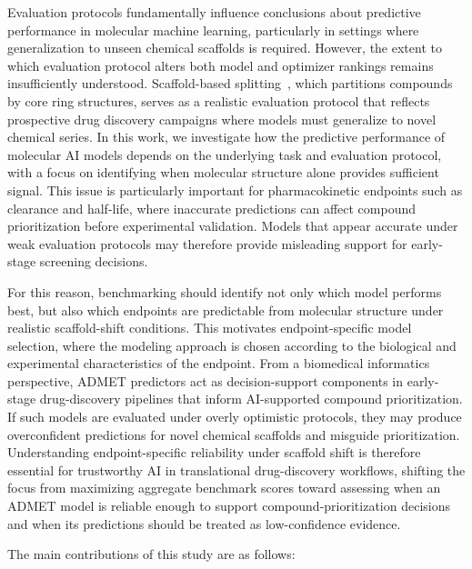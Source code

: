 \documentclass[journal]{IEEEtran}
\begin{document}
Evaluation protocols fundamentally influence conclusions about predictive performance in molecular machine learning, particularly in settings where generalization to unseen chemical scaffolds is required. However, the extent to which evaluation protocol alters both model and optimizer rankings remains insufficiently understood. Scaffold-based splitting~\cite{doi:10.1021/jm9602928}, which partitions compounds by core ring structures, serves as a realistic evaluation protocol that reflects prospective drug discovery campaigns where models must generalize to novel chemical series. In this work, we investigate how the predictive performance of molecular AI models depends on the underlying task and evaluation protocol, with a focus on identifying when molecular structure alone provides sufficient signal. This issue is particularly important for pharmacokinetic endpoints such as clearance and half-life, where inaccurate predictions can affect compound prioritization before experimental validation. Models that appear accurate under weak evaluation protocols may therefore provide misleading support for early-stage screening decisions.

For this reason, benchmarking should identify not only which model performs best, but also which endpoints are predictable from molecular structure under realistic scaffold-shift conditions. This motivates endpoint-specific model selection, where the modeling approach is chosen according to the biological and experimental characteristics of the endpoint. From a biomedical informatics perspective, ADMET predictors act as decision-support components in early-stage drug-discovery pipelines that inform AI-supported compound prioritization. If such models are evaluated under overly optimistic protocols, they may produce overconfident predictions for novel chemical scaffolds and misguide prioritization. Understanding endpoint-specific reliability under scaffold shift is therefore essential for trustworthy AI in translational drug-discovery workflows, shifting the focus from maximizing aggregate benchmark scores toward assessing when an ADMET model is reliable enough to support compound-prioritization decisions and when its predictions should be treated as low-confidence evidence.

The main contributions of this study are as follows:
\end{document}
